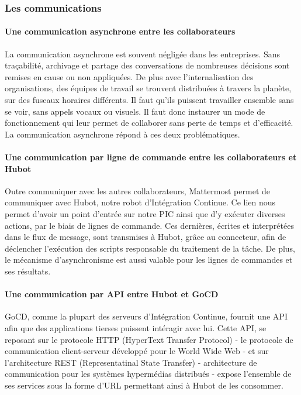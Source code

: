         \subsubsection{Les communications}
          \paragraph{Une communication asynchrone entre les collaborateurs}
          La communication asynchrone est souvent négligée dans les entreprises. Sans traçabilité, archivage et partage des conversations de nombreuses décisions sont remises en cause ou non appliquées. De plus avec l'internalisation des organisations, des équipes de travail se trouvent distribuées à travers la planète, sur des fuseaux horaires différents. Il faut qu'ils puissent travailler ensemble sans se voir, sans appels vocaux ou visuels. Il faut donc instaurer un mode de fonctionnement qui leur permet de collaborer sans perte de temps et d'efficacité. La communication asynchrone répond à ces deux problématiques.

          \paragraph{Une communication par ligne de commande entre les collaborateurs et Hubot}
          Outre communiquer avec les autres collaborateurs, Mattermost permet de communiquer avec Hubot, notre robot d'Intégration Continue. Ce lien nous permet d'avoir un point d'entrée sur notre PIC ainsi que d'y exécuter diverses actions, par le biais de lignes de commande. Ces dernières, écrites et interprétées dans le flux de message, sont transmises à Hubot, grâce au connecteur, afin de déclencher l'exécution des scripts responsable du traitement de la tâche. De plus, le mécanisme d'asynchronisme est aussi valable pour les lignes de commandes et ses résultats.

          \paragraph{Une communication par API entre Hubot et GoCD}
          GoCD, comme la plupart des serveurs d'Intégration Continue, fournit une API afin que des applications tierses puissent intéragir avec lui. Cette API, se reposant sur le protocole HTTP (HyperText Transfer Protocol) - le protocole de communication client-serveur développé pour le World Wide Web - et sur l'architecture REST (Representatinal State Transfer) - architecture de communication pour les systèmes hypermédias distribués - expose l'ensemble de ses services sous la forme d'URL permettant ainsi à Hubot de les consommer.

